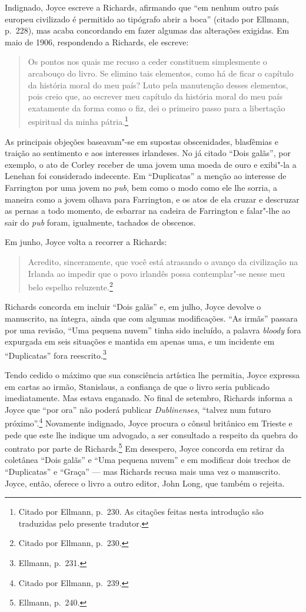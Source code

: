{Indignado, Joyce escreve a Richards, afirmando que “em nenhum outro país europeu
civilizado é permitido ao tipógrafo abrir a boca” (citado por Ellmann, p.~228),
mas acaba concordando em fazer algumas das alterações exigidas. Em maio de
1906, respondendo a Richards, ele escreve: 

\begin{quote}
Os pontos nos quais me recuso a ceder constituem simplesmente o arcabouço do
livro. Se elimino tais elementos, como há de ficar o capítulo da história moral
do meu país? Luto pela manutenção desses elementos, pois creio que, ao escrever
meu capítulo da história moral do meu país exatamente da forma como o fiz, dei
o primeiro passo para a libertação espiritual da minha pátria.\footnote{  Citado por
Ellmann, p.~230. As citações feitas nesta introdução são traduzidas
pelo presente tradutor.}
\end{quote}

As principais objeções baseavam"-se em supostas obscenidades, blasfêmias e
traição ao sentimento e aos interesses irlandeses.  No já citado “Dois galãs”,
por exemplo, o ato de Corley receber de uma jovem uma moeda de ouro e exibi"-la
a Lenehan foi considerado indecente. Em “Duplicatas” a menção ao interesse de
Farrington por uma jovem no \textit{pub}, bem como o modo como ele lhe sorria,
a maneira como a jovem olhava para Farrington, e os atos de ela cruzar e
descruzar as pernas a todo momento, de esbarrar na cadeira de Farrington e
falar"-lhe ao sair do \textit{pub} foram, igualmente, tachados de obscenos.

Em junho, Joyce volta a recorrer a Richards: 

\begin{quote}
Acredito, sinceramente, que você está atrasando o avanço da civilização na Irlanda ao 
impedir que o povo irlandês possa contemplar"-se nesse meu belo espelho reluzente.\footnote{ Citado por
Ellmann, p.~230.} 
\end{quote}

Richards concorda em incluir “Dois galãs” e, em julho, Joyce
devolve o manuscrito, na íntegra, ainda que com algumas modificações. “As
irmãs” passara por uma revisão, “Uma pequena nuvem” tinha sido incluído, a
palavra \textit{bloody} fora expurgada em seis situações e mantida em apenas
uma, e um incidente em “Duplicatas” fora reescrito.\footnote{ Ellmann, p.~231.}

Tendo cedido o máximo que sua consciência artística lhe permitia, Joyce expressa
em cartas ao irmão, Stanislaus, a confiança de que o livro seria publicado
imediatamente. Mas estava enganado. No final de setembro, Richards informa a
Joyce que “por ora” não poderá publicar \textit{Dublinenses}, “talvez num futuro
próximo”.\footnote{ Citado por Ellmann, p.~239.} Novamente indignado, Joyce procura o
cônsul britânico em Trieste e pede que este lhe indique um advogado, a ser
consultado a respeito da quebra do contrato por parte de Richards.\footnote{ Ellmann, p.~240.} 
Em desespero, Joyce concorda em retirar da coletânea “Dois galãs” e “Uma
pequena nuvem” e em modificar dois trechos de “Duplicatas” e “Graça” --- mas
Richards recusa mais uma vez o manuscrito. Joyce, então, oferece o livro a
outro editor, John Long, que também o rejeita.

}
